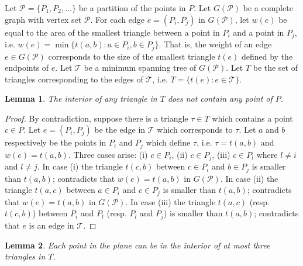 \documentclass[11pt,a4paper]{article}
\newtheorem{lemma}{Lemma}
\begin{document}
Let $\mathcal{P}=\{P_1, P_2,\dots\}$ be a partition of the points in $P$.
Let $G(\mathcal{P})$ be a complete graph with vertex set $\mathcal{P}$. For each edge $e=(P_i,P_j)$ in $G(\mathcal{P})$, let $w(e)$ be equal to the area of the smallest triangle between a point in $P_i$ and a point in $P_j$, i.e. $w(e)=\min\{t(a,b):a\in P_i, b\in P_j\}$. That is, the weight of an edge $e\in G(\mathcal{P})$ corresponds to the size of the smallest triangle $t(e)$ defined by the endpoints of $e$. Let $\mathcal{T}$ be a minimum spanning tree of $G(\mathcal{P})$. Let $T$ be the set of triangles corresponding to the edges of $\mathcal{T}$, i.e. $T=\{t(e): e\in \mathcal{T}\}$. 

\begin{lemma}
 \label{empty-triangle-lemma}
The interior of any triangle in $T$ does not contain any point of $P$.
\end{lemma}
\begin{proof}
  By contradiction, suppose there is a triangle $\tau\in T$ which contains a point $c\in P$. Let $e=(P_i,P_j)$ be the edge in $\mathcal{T}$ which corresponds to $\tau$. Let $a$ and $b$ respectively be the points in $P_i$ and $P_j$ which define $\tau$, i.e. $\tau=t(a,b)$ and $w(e)=t(a,b)$. Three cases arise: (i) $c\in P_i$, (ii) $c\in P_j$, (iii) $c\in P_l$ where $l\neq i$ and $l\neq j$. In case (i) the triangle $t(c,b)$ between $c\in P_i$ and $b\in P_j$ is smaller than $t(a,b)$; contradicts that $w(e)=t(a,b)$ in $G(\mathcal{P})$.  In case (ii) the triangle $t(a,c)$ between $a\in P_i$ and $c\in P_j$ is smaller than $t(a,b)$; contradicts that $w(e)=t(a,b)$ in $G(\mathcal{P})$. In case (iii) the triangle $t(a,c)$ (resp. $t(c,b)$) between $P_i$ and $P_l$ (resp. $P_l$ and $P_j$) is smaller than $t(a,b)$; contradicts that $e$ is an edge in $\mathcal{T}$. 
\end{proof}

\begin{lemma}
 \label{intersection-lemma}
Each point in the plane can be in the interior of at most three triangles in $T$. 
\end{lemma}
\end{document}
